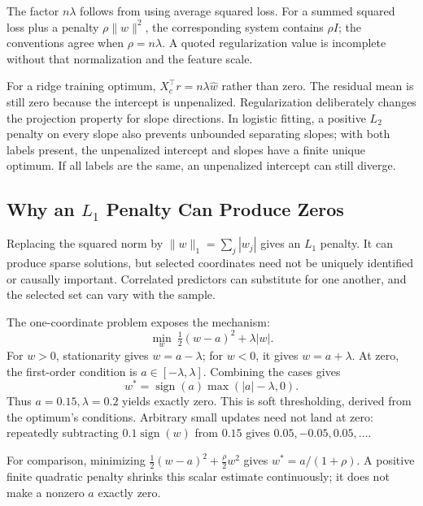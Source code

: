 The factor $n\lambda$ follows from using average squared loss. For a summed squared loss plus a penalty $\rho\|w\|^2$, the corresponding system contains $\rho I$; the conventions agree when $\rho=n\lambda$. A quoted regularization value is incomplete without that normalization and the feature scale.

For a ridge training optimum, $X_c^\top r=n\lambda\hat w$ rather than zero. The residual mean is still zero because the intercept is unpenalized. Regularization deliberately changes the projection property for slope directions. In logistic fitting, a positive $L_2$ penalty on every slope also prevents unbounded separating slopes; with both labels present, the unpenalized intercept and slopes have a finite unique optimum. If all labels are the same, an unpenalized intercept can still diverge.

\subsection{Why an \texorpdfstring{$L_1$}{L1} Penalty Can Produce Zeros}

Replacing the squared norm by $\|w\|_1=\sum_j|w_j|$ gives an $L_1$ penalty. It can produce sparse solutions, but selected coordinates need not be uniquely identified or causally important. Correlated predictors can substitute for one another, and the selected set can vary with the sample.

The one-coordinate problem exposes the mechanism:
\[
\min_w\ \tfrac12(w-a)^2+\lambda|w|.
\]
For $w>0$, stationarity gives $w=a-\lambda$; for $w<0$, it gives $w=a+\lambda$. At zero, the first-order condition is $a\in[-\lambda,\lambda]$. Combining the cases gives
\[
w^*=\operatorname{sign}(a)\max(|a|-\lambda,0).
\]
Thus $a=0.15,\lambda=0.2$ yields exactly zero. This is soft thresholding, derived from the optimum's conditions. Arbitrary small updates need not land at zero: repeatedly subtracting $0.1\operatorname{sign}(w)$ from $0.15$ gives $0.05,-0.05,0.05,\ldots$.

For comparison, minimizing $\tfrac12(w-a)^2+\tfrac\rho2w^2$ gives $w^*=a/(1+\rho)$. A positive finite quadratic penalty shrinks this scalar estimate continuously; it does not make a nonzero $a$ exactly zero.

